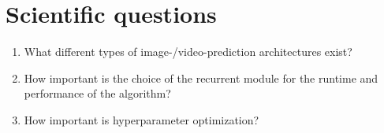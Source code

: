 \section*{Scientific questions}
 \begin{enumerate}
  \item What different types of image-/video-prediction architectures exist?
  \item How important is the choice of the recurrent module for the runtime and performance of the algorithm?
  \item How important is hyperparameter optimization?
 \end{enumerate}